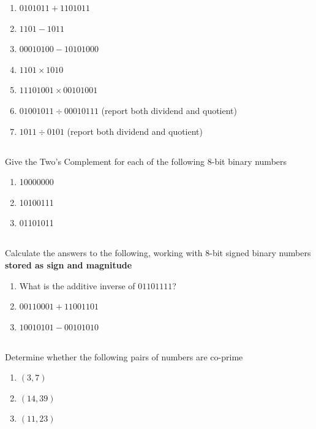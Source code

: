 \documentclass[twocolumn]{article}
\begin{document}
    \begin{enumerate}
        \item $0101011 + 1101011$
        \item $1101 - 1011$
        \item $00010100 - 10101000$
        \item $1101 \times 1010$
        \item $11101001 \times 00101001$
        \item $01001011 \div 00010111$ (report both dividend and quotient)
        \item $1011\div 0101$ (report both dividend and quotient)
    \end{enumerate}

\subsection{}

    Give the Two’s Complement for each of the following 8-bit binary numbers
        
    \begin{enumerate}
        \item 10000000
        \item 10100111
        \item 01101011
    \end{enumerate}

\subsection{}

    Calculate the answers to the following, working with 8-bit signed binary numbers \textbf{stored as sign and magnitude}

    \begin{enumerate}
        \item What is the additive inverse of $01101111$?
        \item $00110001 + 11001101$
        \item $10010101 - 00101010$
    \end{enumerate}

\subsection{}

   Determine whether the following pairs of numbers are co-prime%

  \begin{enumerate}
       \item $(3, 7)$
       \item $(14, 39)$
       \item $(11, 23)$
   \end{enumerate}
\end{document}
